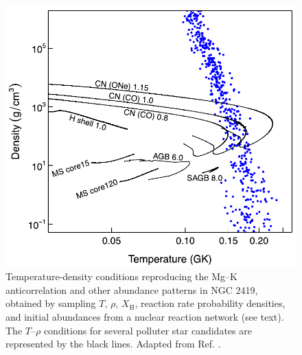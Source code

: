 \begin{figure}[t]
\centering
\includegraphics[width=4.5in]{Chapter-6/figs/Trho_Iliadis2016.png}
\caption{\label{fig:Trho_Iliadis}Temperature-density conditions reproducing the Mg--K anticorrelation and other abundance patterns in NGC 2419, obtained by sampling $T$, $\rho$, $X_{\mathrm{H}}$, reaction rate probability densities, and initial abundances from a nuclear reaction network (see text). The $T$--$\rho$ conditions for several polluter star candidates are represented by the black lines. Adapted from Ref. \cite{Iliadis2016}.}
\end{figure}

